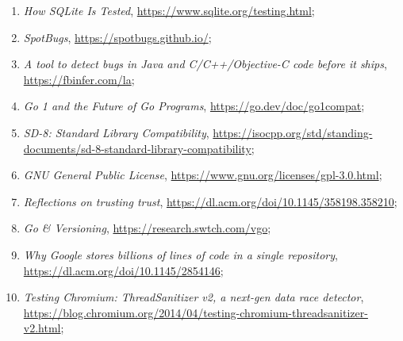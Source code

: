 \documentclass[a4paper,11pt]{article}
\begin{document}
\begin{enumerate}

\item \textit{How SQLite Is Tested},
  \href{https://www.sqlite.org/testing.html}{https://www.sqlite.org/testing.html};



\item \textit{SpotBugs},
  \href{https://spotbugs.github.io/}{https://spotbugs.github.io/};



\item \textit{A tool to detect bugs in Java and C/C++/Objective-C code
    before it ships},
  \href{https://fbinfer.com/}{https://fbinfer.com/la};



\item \textit{Go 1 and the Future of Go Programs},
  \href{https://go.dev/doc/go1compat}{https://go.dev/doc/go1compat};



\item \textit{SD-8: Standard Library Compatibility},
  \href{https://isocpp.org/std/standing-documents/sd-8-standard-library-compatibility}{https://isocpp.org/std/standing-documents/sd-8-standard-library-compatibility};



\item \textit{GNU General Public License},
  \href{https://www.gnu.org/licenses/gpl-3.0.html}{https://www.gnu.org/licenses/gpl-3.0.html};



\item \textit{Reflections on trusting trust},
  \href{https://dl.acm.org/doi/10.1145/358198.358210}{https://dl.acm.org/doi/10.1145/358198.358210};



\item \textit{Go \& Versioning},
  \href{https://research.swtch.com/vgo}{https://research.swtch.com/vgo};



\item \textit{Why Google stores billions of lines of code in a single
    repository},
  \href{https://dl.acm.org/doi/10.1145/2854146}{https://dl.acm.org/doi/10.1145/2854146};



\item \textit{Testing Chromium: ThreadSanitizer v2, a next-gen data
    race
    detector}, \\
  \href{https://blog.chromium.org/2014/04/testing-chromium-threadsanitizer-v2.html}{https://blog.chromium.org/2014/04/testing-chromium-threadsanitizer-v2.html};




\end{enumerate}
\end{document}
